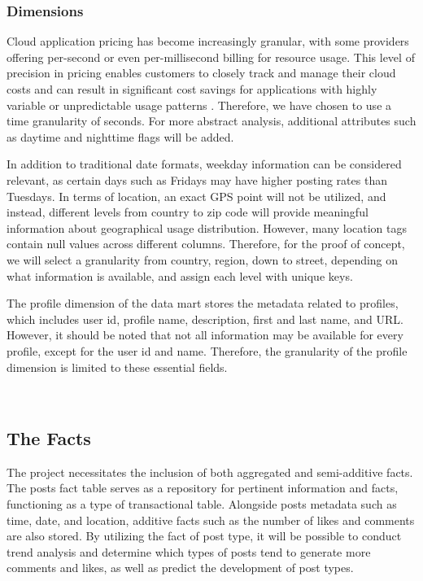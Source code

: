 \documentclass[conference]{IEEEtran}
\begin{document}
\subsubsection{Dimensions}
Cloud application pricing has become increasingly granular, with some providers offering per-second or even per-millisecond billing for resource usage. This level of precision in pricing enables customers to closely track and manage their cloud costs and can result in significant cost savings for applications with highly variable or unpredictable usage patterns \cite{alizadeh2018chameleon}. Therefore, we have chosen to use a time granularity of seconds. For more abstract analysis, additional attributes such as daytime and nighttime flags will be added. 

In addition to traditional date formats, weekday information can be considered relevant, as certain days such as Fridays may have higher posting rates than Tuesdays.
In terms of location, an exact GPS point will not be utilized, and instead, different levels from country to zip code will provide meaningful information about geographical usage distribution. However, many location tags contain null values across different columns. Therefore, for the proof of concept, we will select a granularity from country, region, down to  street, depending on what information is available, and assign each level with unique keys.

The profile dimension of the data mart stores the metadata related to profiles, which includes user id, profile name, description, first and last name, and URL. However, it should be noted that not all information may be available for every profile, except for the user id and name. Therefore, the granularity of the profile dimension is limited to these essential fields.

\\
\subsection{The Facts}
The project necessitates the inclusion of both aggregated and semi-additive facts. The posts fact table serves as a repository for pertinent information and facts, functioning as a type of transactional table. Alongside posts metadata such as time, date, and location, additive facts such as the number of likes and comments are also stored. By utilizing the fact of post type, it will be possible to conduct trend analysis and determine which types of posts tend to generate more comments and likes, as well as predict the development of post types.
\end{document}

